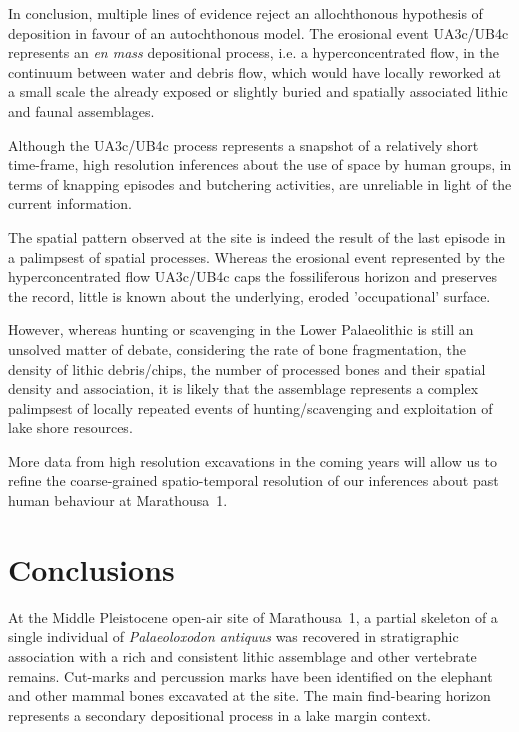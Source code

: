 \documentclass[preprint,authoryear,times]{elsarticle} %
\begin{document}
In conclusion, multiple lines of evidence reject an allochthonous hypothesis of deposition in favour of an autochthonous model. The erosional event UA3c/UB4c represents an \emph{en mass} depositional process, i.e. a hyperconcentrated flow, in the continuum between water and debris flow, which would have locally reworked at a small scale the already exposed or slightly buried and spatially associated lithic and faunal assemblages.

Although the UA3c/UB4c process represents a snapshot of a relatively short time-frame, high resolution inferences about the use of space by human groups, in terms of knapping episodes and butchering activities, are unreliable in light of the current information.

The spatial pattern observed at the site is indeed the result of the last episode in a palimpsest of spatial processes. Whereas the erosional event represented by the hyperconcentrated flow UA3c/UB4c caps the fossiliferous horizon and preserves the record, little is known about the underlying, eroded 'occupational' surface.

However, whereas hunting or scavenging in the Lower Palaeolithic is still an unsolved matter of debate, considering the rate of bone fragmentation, the density of lithic debris/chips, the number of processed bones and their spatial density and association, it is likely that the assemblage represents a complex palimpsest of locally repeated events of hunting/scavenging and exploitation of lake shore resources. %

More data from high resolution excavations in the coming years will allow us to refine the coarse-grained spatio-temporal resolution of our inferences about past human behaviour at Marathousa~1.

\section{Conclusions}

At the Middle Pleistocene open-air site of Marathousa~1, a partial skeleton of a single individual of \emph{Palaeoloxodon antiquus} was recovered in stratigraphic association with a rich and consistent lithic assemblage and other vertebrate remains. Cut-marks and percussion marks have been identified on the elephant and other mammal bones excavated at the site. The main find-bearing horizon represents a secondary depositional process in a lake margin context.
\end{document}
